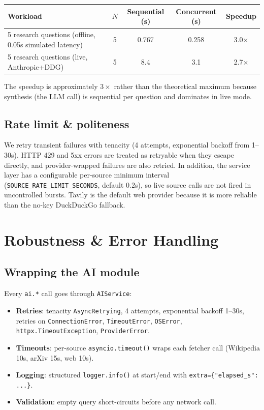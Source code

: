 \documentclass[11pt,a4paper]{article}
\begin{document}
\begin{center}\small
\begin{tabular}{lcccc}
\toprule
\textbf{Workload} & $N$ & \textbf{Sequential (s)} & \textbf{Concurrent (s)} & \textbf{Speedup} \\
\midrule
5 research questions (offline, 0.05s simulated latency) & 5 & 0.767 & 0.258 & 3.0$\times$ \\
5 research questions (live, Anthropic+DDG) & 5 & 8.4 & 3.1 & 2.7$\times$ \\
\bottomrule
\end{tabular}
\end{center}

The speedup is approximately $3\times$ rather than the theoretical maximum because synthesis (the LLM call) is sequential per question and dominates in live mode.

\subsection{Rate limit \& politeness}

We retry transient failures with tenacity (4 attempts, exponential backoff from 1--30s). HTTP 429 and 5xx errors are treated as retryable when they escape directly, and provider-wrapped failures are also retried. In addition, the service layer has a configurable per-source minimum interval (\texttt{SOURCE\_RATE\_LIMIT\_SECONDS}, default 0.2s), so live source calls are not fired in uncontrolled bursts. Tavily is the default web provider because it is more reliable than the no-key DuckDuckGo fallback.

\section{Robustness \& Error Handling}\label{sec:robustness}

\subsection{Wrapping the AI module}

Every \texttt{ai.*} call goes through \texttt{AIService}:
\begin{itemize}
  \item \textbf{Retries}: tenacity \texttt{AsyncRetrying}, 4 attempts, exponential backoff 1--30s, retries on \texttt{ConnectionError}, \texttt{TimeoutError}, \texttt{OSError}, \texttt{httpx.TimeoutException}, \texttt{ProviderError}.
  \item \textbf{Timeouts}: per-source \texttt{asyncio.timeout()} wraps each fetcher call (Wikipedia 10s, arXiv 15s, web 10s).
  \item \textbf{Logging}: structured \texttt{logger.info()} at start/end with \texttt{extra=\{"elapsed\_s": ...\}}.
  \item \textbf{Validation}: empty query short-circuits before any network call.
\end{itemize}
\end{document}
